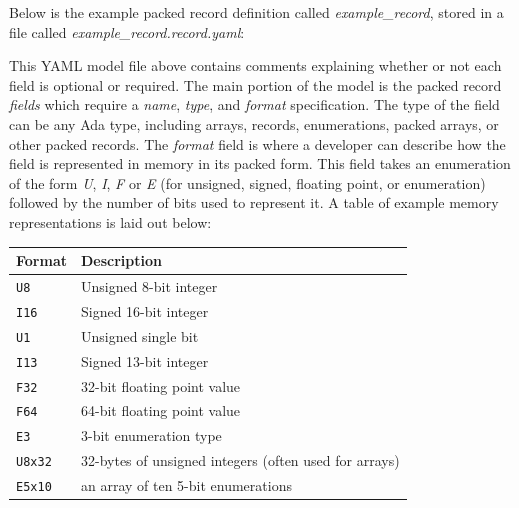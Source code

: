 Below is the example packed record definition called \textit{example\_record}, stored in a file called \textit{example\_record.record.yaml}:


This YAML model file above contains comments explaining whether or not each field is optional or required. The main portion of the model is the packed record \textit{fields} which require a \textit{name}, \textit{type}, and \textit{format} specification. The type of the field can be any Ada type, including arrays, records, enumerations, packed arrays, or other packed records. The \textit{format} field is where a developer can describe how the field is represented in memory in its packed form. This field takes an enumeration of the form \textit{U}, \textit{I}, \textit{F} or \textit{E} (for unsigned, signed, floating point, or enumeration) followed by the number of bits used to represent it. A table of example memory representations is laid out below:

\begin{xltabular}{\textwidth}{ | l | X | }
  \hline
  \textbf{Format} & \textbf{Description} \\ \hline
    \texttt{U8} & Unsigned 8-bit integer \\ \hline
    \texttt{I16} & Signed 16-bit integer \\ \hline
    \texttt{U1} & Unsigned single bit \\ \hline
    \texttt{I13} & Signed 13-bit integer \\ \hline
    \texttt{F32} & 32-bit floating point value \\ \hline
    \texttt{F64} & 64-bit floating point value \\ \hline
    \texttt{E3} & 3-bit enumeration type \\ \hline
    \texttt{U8x32} & 32-bytes of unsigned integers (often used for arrays) \\ \hline
    \texttt{E5x10} & an array of ten 5-bit enumerations \\ \hline
\end{xltabular}

